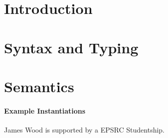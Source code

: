 \documentclass[sigplan,review]{acmart}\settopmatter{printfolios=true,printccs=false,printacmref=false}
\begin{document}
\section{Introduction}
\label{sec:introduction}


\section{Syntax and Typing}
\label{sec:syntax}


\section{Semantics}
\label{sec:semantics}


\paragraph{Example Instantiations}



\begin{acks}                            %
  James Wood is supported by a EPSRC Studentship.
\end{acks}






\end{document}
